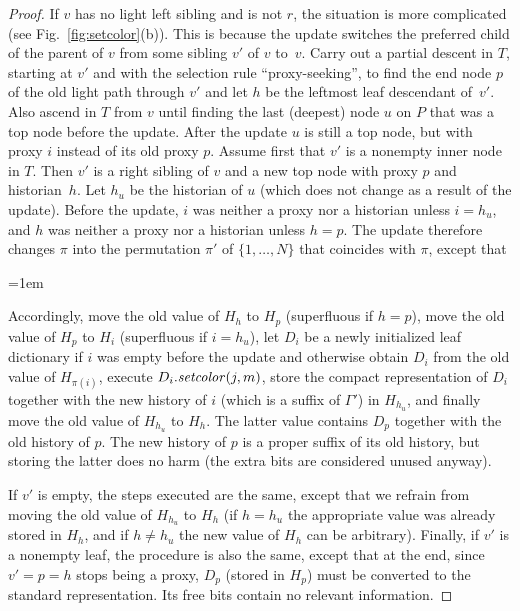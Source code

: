 \documentclass[envcountsame,envcountsect,undated,nolinenumbers]{lnthi}
\def\Tvn#1{\hbox{\textit{#1\/}}}
\begin{document}
\begin{proof}
If $v$ has no light left sibling and is not $r$,
the situation is more complicated
(see Fig.~\ref{fig:setcolor}(b)).
This is because the update switches the
preferred child of the parent of $v$
from some sibling $v'$ of $v$ to~$v$.
Carry out a partial descent in $T$,
starting at $v'$ and with the
selection rule ``proxy-seeking'', to find the
end node $p$ of the old light path through $v'$
and let $h$ be the leftmost leaf descendant of~$v'$.
Also ascend in $T$ from $v$ until finding
the last (deepest) node $u$ on $P$
that was a top node before the update.
After the update $u$ is still a top node,
but with proxy $i$ instead of its old proxy $p$.
Assume first that $v'$ is a nonempty inner node in $T$.
Then $v'$ is a right sibling of $v$ and a new top node with
proxy $p$ and historian~$h$.
Let $h_u$ be the historian of $u$
(which does not change as a result of the update).
Before the update, $i$ was neither a proxy nor a
historian unless $i=h_u$,
and $h$ was neither a proxy nor a historian
unless $h=p$.
The update therefore changes $\pi$ into the permutation
$\pi'$ of $\{1,\ldots,N\}$ that coincides with $\pi$, except that

\medskip

\centerline{\vbox{\tabskip=1em}}

\medskip
\noindent
Accordingly,
move the old value of $H_h$ to $H_p$ (superfluous if $h=p$),
move the old value of $H_p$ to $H_i$
(superfluous if $i=h_u$),
let $D_i$ be a newly initialized leaf dictionary
if $i$ was empty before the update
and otherwise obtain $D_i$ from the old value of $H_{\pi(i)}$,
execute $D_i.\Tvn{setcolor}(j,m)$,
store the compact representation of $D_i$
together with the new history of $i$
(which is a suffix of $\Gamma'$) in $H_{h_u}$,
and finally move the old value of $H_{h_u}$ to $H_h$.
The latter value contains $D_{p}$ together with the
old history of $p$.
The new history of $p$ is a proper suffix of its
old history, but storing the latter does no harm
(the extra bits are considered unused anyway).

If $v'$ is empty, the steps executed are the same,
except that we refrain from moving
the old value of $H_{h_u}$ to $H_h$
(if $h=h_u$ the appropriate value was already stored in $H_h$,
and if $h\not=h_u$
the new value of $H_h$ can be arbitrary).
Finally, if $v'$ is a nonempty leaf,
the procedure is also the same, except that
at the end,
since $v'=p=h$ stops being a proxy, $D_p$
(stored in $H_p$) must be converted to the standard representation.
Its free bits contain no relevant information.


\end{proof}
\end{document}
